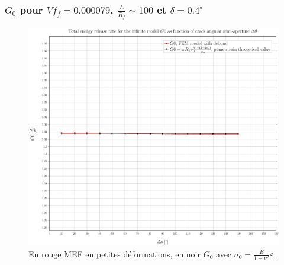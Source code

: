 \documentclass[first,firstsupp,lastsupp,handout,last,hyperref,table]{ETHclass}
\begin{document}
\begin{frame}
\frametitle{\small $G_{0}$ pour $Vf_{f}=0.000079$, $\frac{L}{R_{f}}\sim100$ et $\delta=0.4^{\circ}$}
\vspace{-0.5cm}
\centering
\captionsetup[figure]{font=scriptsize,labelfont=scriptsize}
\begin{figure}[!h]
\centering
\includegraphics[height=0.7\textheight]{2017-06-16_AbqRunSummary_SingleFiberEqRfSmallStrain-D0-4_G0_Summary.pdf}
  \caption{\scriptsize En rouge MEF en petites d\'eformations, en noir $G_{0}$ avec $\sigma_{0}=\frac{E}{1-\nu^{2}}\varepsilon$.}
  \label{fig:res1}
\end{figure}
\end{frame}

\end{document}
